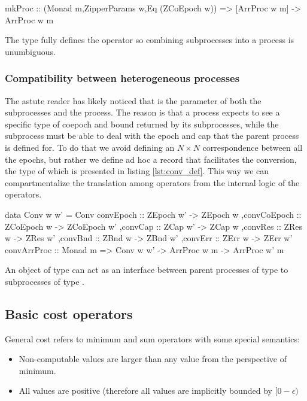 \begin{code}
\begin{haskellcode}
mkProc
  :: (Monad m,ZipperParams w,Eq (ZCoEpoch w)) => [ArrProc w m] -> ArrProc w m
\end{haskellcode}
  \caption{\label{lst:mkproc}The type  fully defines the
    operator so combining subprocesses into a process is unumbiguous.}
\end{code}

\subsubsection{Compatibility  between heterogeneous processes}

The astute reader has likely noticed that  is the parameter of
both the subprocesses and the process. The reason is that a process
expects to see a specific type of coepoch and bound returned by its
subprocesses, while the subprocess must be able to deal with the epoch
and cap that the parent process is defined for. To do that we avoid
defining an \(N \times N\) correspondence between all the epochs, but
rather we define ad hoc a record that facilitates the conversion, the
type of which is presented in listing \ref{lst:conv_def}. This way we
can compartmentalize the translation among operators from the internal
logic of the operators.

\begin{code}
\begin{haskellcode}
data Conv w w' =
  Conv
  { convEpoch :: ZEpoch w' -> ZEpoch w
   ,convCoEpoch :: ZCoEpoch w -> ZCoEpoch w'
   ,convCap :: ZCap w' -> ZCap w
   ,convRes :: ZRes w -> ZRes w'
   ,convBnd :: ZBnd w -> ZBnd w'
   ,convErr :: ZErr w -> ZErr w'
  }
convArrProc :: Monad m => Conv w w' -> ArrProc w m -> ArrProc w' m
\end{haskellcode}
  \caption{\label{lst:conv_def}An object of type  can
    act as an interface between parent processes of type  to
    subprocesses of type .}
\end{code}


\subsection{Basic cost operators}

General cost refers to minimum and sum operators with some special
semantics:

\begin{itemize}
\item Non-computable values are larger than any value from the
  perspective of minimum.
\item All values are positive (therefore all values are implicitly
  bounded by \([0 - \epsilon)\)
\end{itemize}

